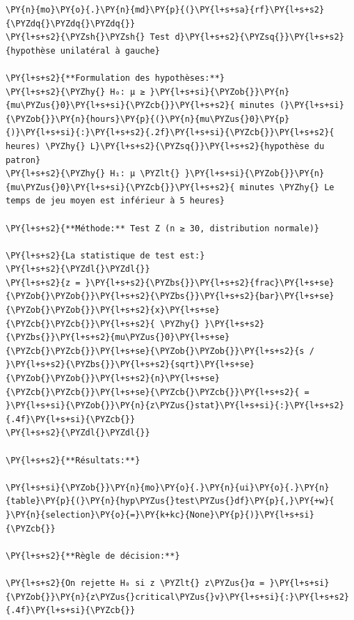     \begin{tcolorbox}[breakable, size=fbox, boxrule=1pt, pad at break*=1mm,colback=cellbackground, colframe=cellborder]
\begin{Verbatim}[commandchars=\\\{\}]
\PY{n}{mo}\PY{o}{.}\PY{n}{md}\PY{p}{(}\PY{l+s+sa}{rf}\PY{l+s+s2}{\PYZdq{}\PYZdq{}\PYZdq{}}
\PY{l+s+s2}{\PYZsh{}\PYZsh{} Test d}\PY{l+s+s2}{\PYZsq{}}\PY{l+s+s2}{hypothèse unilatéral à gauche}

\PY{l+s+s2}{**Formulation des hypothèses:**}
\PY{l+s+s2}{\PYZhy{} H₀: μ ≥ }\PY{l+s+si}{\PYZob{}}\PY{n}{mu\PYZus{}0}\PY{l+s+si}{\PYZcb{}}\PY{l+s+s2}{ minutes (}\PY{l+s+si}{\PYZob{}}\PY{n}{hours}\PY{p}{(}\PY{n}{mu\PYZus{}0}\PY{p}{)}\PY{l+s+si}{:}\PY{l+s+s2}{.2f}\PY{l+s+si}{\PYZcb{}}\PY{l+s+s2}{ heures) \PYZhy{} L}\PY{l+s+s2}{\PYZsq{}}\PY{l+s+s2}{hypothèse du patron}
\PY{l+s+s2}{\PYZhy{} H₁: μ \PYZlt{} }\PY{l+s+si}{\PYZob{}}\PY{n}{mu\PYZus{}0}\PY{l+s+si}{\PYZcb{}}\PY{l+s+s2}{ minutes \PYZhy{} Le temps de jeu moyen est inférieur à 5 heures}

\PY{l+s+s2}{**Méthode:** Test Z (n ≥ 30, distribution normale)}

\PY{l+s+s2}{La statistique de test est:}
\PY{l+s+s2}{\PYZdl{}\PYZdl{}}
\PY{l+s+s2}{z = }\PY{l+s+s2}{\PYZbs{}}\PY{l+s+s2}{frac}\PY{l+s+se}{\PYZob{}\PYZob{}}\PY{l+s+s2}{\PYZbs{}}\PY{l+s+s2}{bar}\PY{l+s+se}{\PYZob{}\PYZob{}}\PY{l+s+s2}{x}\PY{l+s+se}{\PYZcb{}\PYZcb{}}\PY{l+s+s2}{ \PYZhy{} }\PY{l+s+s2}{\PYZbs{}}\PY{l+s+s2}{mu\PYZus{}0}\PY{l+s+se}{\PYZcb{}\PYZcb{}}\PY{l+s+se}{\PYZob{}\PYZob{}}\PY{l+s+s2}{s / }\PY{l+s+s2}{\PYZbs{}}\PY{l+s+s2}{sqrt}\PY{l+s+se}{\PYZob{}\PYZob{}}\PY{l+s+s2}{n}\PY{l+s+se}{\PYZcb{}\PYZcb{}}\PY{l+s+se}{\PYZcb{}\PYZcb{}}\PY{l+s+s2}{ = }\PY{l+s+si}{\PYZob{}}\PY{n}{z\PYZus{}stat}\PY{l+s+si}{:}\PY{l+s+s2}{.4f}\PY{l+s+si}{\PYZcb{}}
\PY{l+s+s2}{\PYZdl{}\PYZdl{}}

\PY{l+s+s2}{**Résultats:**}

\PY{l+s+si}{\PYZob{}}\PY{n}{mo}\PY{o}{.}\PY{n}{ui}\PY{o}{.}\PY{n}{table}\PY{p}{(}\PY{n}{hyp\PYZus{}test\PYZus{}df}\PY{p}{,}\PY{+w}{ }\PY{n}{selection}\PY{o}{=}\PY{k+kc}{None}\PY{p}{)}\PY{l+s+si}{\PYZcb{}}

\PY{l+s+s2}{**Règle de décision:**}

\PY{l+s+s2}{On rejette H₀ si z \PYZlt{} z\PYZus{}α = }\PY{l+s+si}{\PYZob{}}\PY{n}{z\PYZus{}critical\PYZus{}v}\PY{l+s+si}{:}\PY{l+s+s2}{.4f}\PY{l+s+si}{\PYZcb{}}


\end{Verbatim}
\end{tcolorbox}
